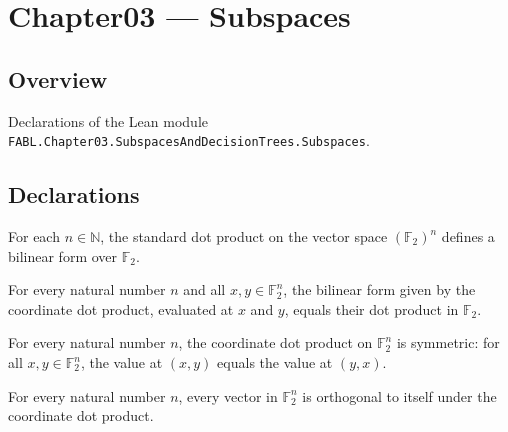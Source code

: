 \chapter{Chapter03 — Subspaces}
\section{Overview}

Declarations of the Lean module \texttt{FABL.Chapter03.SubspacesAndDecisionTrees.Subspaces}.

\section{Declarations}

\begin{definition}
\leanok
{}
For each $n\in\mathbb{N}$, the standard dot product on the vector space
$(\mathbb{F}_2)^n$ defines a bilinear form over $\mathbb{F}_2$.
\end{definition}

\begin{theorem}
\leanok
{}
For every natural number $n$ and all $x,y\in\mathbb{F}_2^n$, the bilinear form given by
the coordinate dot product, evaluated at $x$ and $y$, equals their dot product in
$\mathbb{F}_2$.
\end{theorem}

\begin{theorem}
\leanok
{}
For every natural number $n$, the coordinate dot product on $\mathbb{F}_2^n$ is
symmetric: for all $x,y\in\mathbb{F}_2^n$, the value at $(x,y)$ equals the value at
$(y,x)$.
\end{theorem}

\begin{theorem}
\leanok
{}
For every natural number $n$, every vector in $\mathbb{F}_2^n$ is orthogonal to itself
under the coordinate dot product.
\end{theorem}

